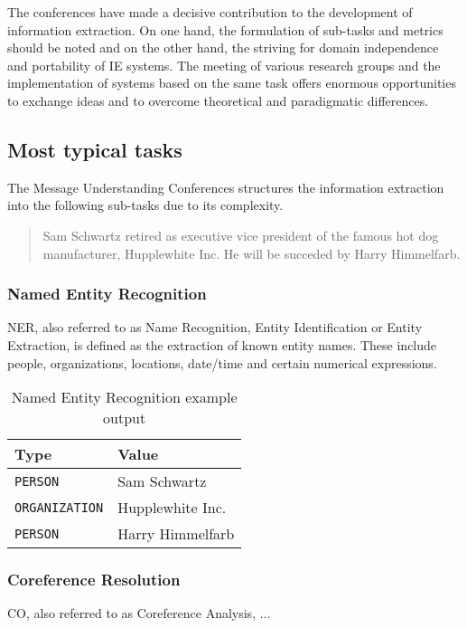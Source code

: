 The conferences have made a decisive contribution to the development of information extraction. On one hand, the formulation of sub-tasks and metrics should be noted and on the other hand, the striving for domain independence and portability of \gls{IE} systems. The meeting of various research groups and the implementation of systems based on the same task offers enormous opportunities to exchange ideas and to overcome theoretical and paradigmatic differences.

\newpage
\subsection{Most typical tasks}

The Message Understanding Conferences structures the information extraction into the following sub-tasks due to its complexity.


\begin{quote}
Sam Schwartz retired as executive vice president of the famous hot dog manufacturer, Hupplewhite Inc. He will be succeded by Harry Himmelfarb.
\cite{Grishman:1997}
\end{quote}

\subsubsection{Named Entity Recognition}
\gls{NER}, also referred to as Name Recognition, Entity Identification or Entity Extraction, is defined as the extraction of known entity names. These include people, organizations, locations, date/time and certain numerical expressions. 

\begin{table}[H]
\centering
\begin{tabular*}{\textwidth}{ l  l }
	\toprule
	\textbf{Type} & \textbf{Value} \\
	\midrule
	\texttt{PERSON} & Sam Schwartz \\
	\texttt{ORGANIZATION} & Hupplewhite Inc. \\
	\texttt{PERSON} & Harry Himmelfarb \\
	\bottomrule
\end{tabular*}
\caption{Named Entity Recognition example output}
\end{table}

\subsubsection{Coreference Resolution}
\gls{CO}, also referred to as Coreference Analysis, ...

